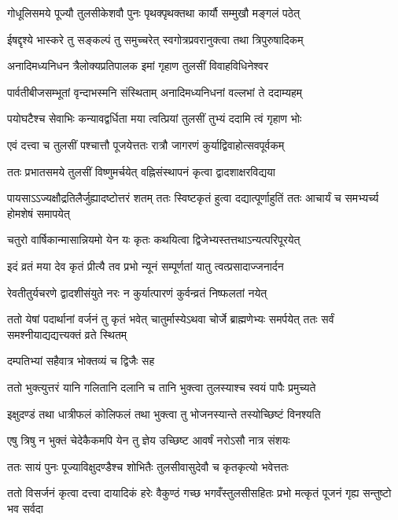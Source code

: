 \twolineshloka
{गोधूलिसमये पूज्यौ तुलसीकेशवौ पुनः}
{पृथक्पृथक्तथा कार्यौ सम्मुखौ मङ्गलं पठेत्} %

\twolineshloka
{ईषद्दृश्ये भास्करे तु सङ्कल्पं तु समुच्चरेत्}
{स्वगोत्रप्रवरानुक्त्वा तथा त्रिपुरुषादिकम्} %

\twolineshloka
{अनादिमध्यनिधन त्रैलोक्यप्रतिपालक}
{इमां गृहाण तुलसीं विवाहविधिनेश्वर} %

\twolineshloka
{पार्वतीबीजसम्भूतां वृन्दाभस्मनि संस्थिताम्}
{अनादिमध्यनिधनां वल्लभां ते ददाम्यहम्} %

\twolineshloka
{पयोघटैश्च सेवाभिः कन्यावद्वर्धिता मया}
{त्वत्प्रियां तुलसीं तुभ्यं ददामि त्वं गृहाण भोः} %

\twolineshloka
{एवं दत्त्वा च तुलसीं पश्चात्तौ पूजयेत्ततः}
{रात्रौ जागरणं कुर्याद्विवाहोत्सवपूर्वकम्} %

\twolineshloka
{ततः प्रभातसमये तुलसीं विष्णुमर्चयेत्}
{वह्निसंस्थापनं कृत्वा द्वादशाक्षरविद्यया} %

\threelineshloka
{पायसाऽऽज्यक्षौद्रतिलैर्जुह्यादष्टोत्तरं शतम्}
{ततः स्विष्टकृतं हुत्वा दद्यात्पूर्णाहुतिं ततः}
{आचार्यं च समभ्यर्च्य होमशेषं समापयेत्} %

\twolineshloka
{चतुरो वार्षिकान्मासान्नियमो येन यः कृतः}
{कथयित्वा द्विजेभ्यस्तत्तथाऽन्यत्परिपूरयेत्} %

\twolineshloka
{इदं व्रतं मया देव कृतं प्रीत्यै तव प्रभो}
{न्यूनं सम्पूर्णतां यातु त्वत्प्रसादाज्जनार्दन} %

\twolineshloka
{रेवतीतुर्यचरणे द्वादशीसंयुते नरः}
{न कुर्यात्पारणं कुर्वन्व्रतं निष्फलतां नयेत्} %

\threelineshloka
{ततो येषां पदार्थानां वर्जनं तु कृतं भवेत्}
{चातुर्मास्येऽथवा चोर्जे ब्राह्मणेभ्यः समर्पयेत्}
{ततः सर्वं समश्नीयाद्यद्यत्त्यक्तं व्रते स्थितम्} %


\onelineshloka
{दम्पतिभ्यां सहैवात्र भोक्तव्यं च द्विजैः सह} %

\twolineshloka
{ततो भुक्त्युत्तरं यानि गलितानि दलानि च}
{तानि भुक्त्वा तुलस्याश्च स्वयं पापैः प्रमुच्यते} %

\twolineshloka
{इक्षुदण्डं तथा धात्रीफलं कोलिफलं तथा}
{भुक्त्वा तु भोजनस्यान्ते तस्योच्छिष्टं विनश्यति} %

\twolineshloka
{एषु त्रिषु न भुक्तं चेदेकैकमपि येन तु}
{ज्ञेय उच्छिष्ट आवर्षं नरोऽसौ नात्र संशयः} %

\twolineshloka
{ततः सायं पुनः पूज्याविक्षुदण्डैश्च शोभितैः}
{तुलसीवासुदेवौ च कृतकृत्यो भवेत्ततः} %

\threelineshloka
{ततो विसर्जनं कृत्वा दत्त्वा दायादिकं हरेः}
{वैकुण्ठं गच्छ भगवँस्तुलसीसहितः प्रभो}
{मत्कृतं पूजनं गृह्य सन्तुष्टो भव सर्वदा} %

